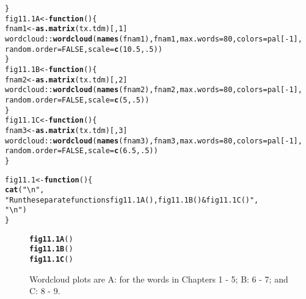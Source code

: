 \documentclass[12pt, a4paper,  BCOR=8.25mm, DIV=15]{scrartcl}\usepackage[]{graphicx}\usepackage[]{color}
\makeatletter
\newcommand{\hlnum}[1]{\textcolor[rgb]{0.686,0.059,0.569}{#1}}%
\newcommand{\hlstr}[1]{\textcolor[rgb]{0.192,0.494,0.8}{#1}}%
\newcommand{\hlopt}[1]{\textcolor[rgb]{0,0,0}{#1}}%
\newcommand{\hlstd}[1]{\textcolor[rgb]{0.345,0.345,0.345}{#1}}%
\newcommand{\hlkwa}[1]{\textcolor[rgb]{0.161,0.373,0.58}{\textbf{#1}}}%
\newcommand{\hlkwb}[1]{\textcolor[rgb]{0.69,0.353,0.396}{#1}}%
\newcommand{\hlkwc}[1]{\textcolor[rgb]{0.333,0.667,0.333}{#1}}%
\newcommand{\hlkwd}[1]{\textcolor[rgb]{0.737,0.353,0.396}{\textbf{#1}}}%
\newenvironment{kframe}{%
 \def\at@end@of@kframe{}%
 \ifinner\ifhmode%
  \def\at@end@of@kframe{\end{minipage}}%
  \begin{minipage}{\columnwidth}%
 \fi\fi%
 \def\FrameCommand##1{\hskip\@totalleftmargin \hskip-\fboxsep
 \colorbox{shadecolor}{##1}\hskip-\fboxsep
     \hskip-\linewidth \hskip-\@totalleftmargin \hskip\columnwidth}%
 \MakeFramed {\advance\hsize-\width
   \@totalleftmargin\z@ \linewidth\hsize
   \@setminipage}}%
 {\par\unskip\endMakeFramed%
 \at@end@of@kframe}
\newenvironment{knitrout}{}{} %
\makeatother
\begin{document}
\begin{knitrout}
\begin{kframe}
\begin{alltt}
\hlstd{\}}
\hlstd{fig11.1A} \hlkwb{<-} \hlkwa{function}\hlstd{()\{}
\hlstd{fnam1} \hlkwb{<-} \hlkwd{as.matrix}\hlstd{(tx.tdm)[,}\hlnum{1}\hlstd{]}
\hlstd{wordcloud}\hlopt{::}\hlkwd{wordcloud}\hlstd{(}\hlkwd{names}\hlstd{(fnam1), fnam1,} \hlkwc{max.words}\hlstd{=}\hlnum{80}\hlstd{,} \hlkwc{colors}\hlstd{=pal[}\hlopt{-}\hlnum{1}\hlstd{],}
          \hlkwc{random.order}\hlstd{=}\hlnum{FALSE}\hlstd{,} \hlkwc{scale}\hlstd{=}\hlkwd{c}\hlstd{(}\hlnum{10.5}\hlstd{,}\hlnum{.5}\hlstd{))}
\hlstd{\}}
\hlstd{fig11.1B} \hlkwb{<-} \hlkwa{function}\hlstd{()\{}
\hlstd{fnam2} \hlkwb{<-} \hlkwd{as.matrix}\hlstd{(tx.tdm)[,}\hlnum{2}\hlstd{]}
\hlstd{wordcloud}\hlopt{::}\hlkwd{wordcloud}\hlstd{(}\hlkwd{names}\hlstd{(fnam2), fnam2,} \hlkwc{max.words}\hlstd{=}\hlnum{80}\hlstd{,} \hlkwc{colors}\hlstd{=pal[}\hlopt{-}\hlnum{1}\hlstd{],}
          \hlkwc{random.order}\hlstd{=}\hlnum{FALSE}\hlstd{,} \hlkwc{scale}\hlstd{=}\hlkwd{c}\hlstd{(}\hlnum{5}\hlstd{,}\hlnum{.5}\hlstd{))}
\hlstd{\}}
\hlstd{fig11.1C} \hlkwb{<-} \hlkwa{function}\hlstd{()\{}
\hlstd{fnam3} \hlkwb{<-} \hlkwd{as.matrix}\hlstd{(tx.tdm)[,}\hlnum{3}\hlstd{]}
\hlstd{wordcloud}\hlopt{::}\hlkwd{wordcloud}\hlstd{(}\hlkwd{names}\hlstd{(fnam3), fnam3,} \hlkwc{max.words}\hlstd{=}\hlnum{80}\hlstd{,} \hlkwc{colors}\hlstd{=pal[}\hlopt{-}\hlnum{1}\hlstd{],}
          \hlkwc{random.order}\hlstd{=}\hlnum{FALSE}\hlstd{,} \hlkwc{scale}\hlstd{=}\hlkwd{c}\hlstd{(}\hlnum{6.5}\hlstd{,}\hlnum{.5}\hlstd{))}
\hlstd{\}}
\end{alltt}
\end{kframe}
\end{knitrout}

\begin{knitrout}
\color{fgcolor}\begin{kframe}
\begin{alltt}
\hlstd{fig11.1} \hlkwb{<-} \hlkwa{function}\hlstd{()\{}
    \hlkwd{cat}\hlstd{(}\hlstr{"\textbackslash{}n"}\hlstd{,}
        \hlstr{"Run the separate functions fig11.1A(), fig11.1B() & fig11.1C()"}\hlstd{,}
        \hlstr{"\textbackslash{}n"}\hlstd{)}
\hlstd{\}}
\end{alltt}
\end{kframe}
\end{knitrout}

\begin{figure}
\begin{knitrout}
\color{fgcolor}\begin{kframe}
\begin{alltt}
\hlkwd{fig11.1A}\hlstd{()}
\hlkwd{fig11.1B}\hlstd{()}
\hlkwd{fig11.1C}\hlstd{()}
\end{alltt}
\end{kframe}
\end{knitrout}

\caption{Wordcloud plots are A: for the words in Chapters 1 - 5; B: 6 -
  7; and C: 8 - 9.\label{fig:wc}}
\end{figure}
\end{document}
